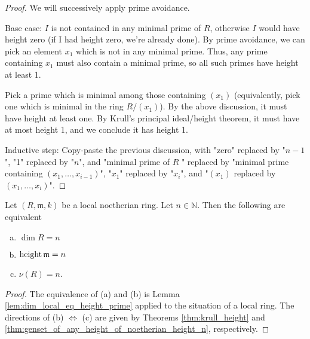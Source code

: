 \begin{proof}
    We will successively apply prime avoidance.

    Base case: 
    \(I\) is not contained in any minimal prime of \(R\),
    otherwise \(I\) would have height zero (if I had height
    zero, we're already done).
    By prime avoidance, we can pick an element \(x_{1}\) which is
    not in any minimal prime. 
    Thus, any prime containing \(x_{1}\) must also contain a minimal prime, so
    all such primes have height at least 1.
    
    Pick a prime which is minimal among those containing \((x_{1})\)
    (equivalently, pick one which is minimal in the ring \(R / (x_{1})\)).
    By the above discussion, it must have height at least one. 
    By Krull's principal ideal/height theorem, it must have at most height 1,
    and we conclude it has height 1.

    Inductive step:
    Copy-paste the previous discussion, with "zero" replaced by "\(n-1\)",
    "1" replaced by "\(n\)", and "minimal prime of \(R\) " replaced by
    "minimal prime containing \((x_{1}, \ldots, x_{i-1})\)", 
    "\(x_{1}\)" replaced by "\(x_{i}\)", and
    "\((x_{1})\) replaced by \((x_{1}, \ldots, x_{i})\)".
   
\end{proof}


\begin{theorem}
    \label{thm:dimension_theorem}
    Let \((R,\mathfrak{m},k)\) be a local noetherian ring.
    Let \(n \in \mathbb{N}\).
    Then the following are equivalent
    \begin{enumerate}[(a)]
        \item \(\dim R = n\)
        \item \(\operatorname{height} \mathfrak{m} = n\)
        \item \(\nu(R) = n\).
    \end{enumerate}
\end{theorem}

\begin{proof}
    The equivalence of (a) and (b) is
    Lemma \ref{lem:dim_local_eq_height_prime}
    applied to the situation of a local ring.
    The directions of (b) \(\iff\) (c) are given
    by Theorems \ref{thm:krull_height} and
    \ref{thm:genset_of_any_height_of_noetherian_height_n},
    respectively.
\end{proof}


